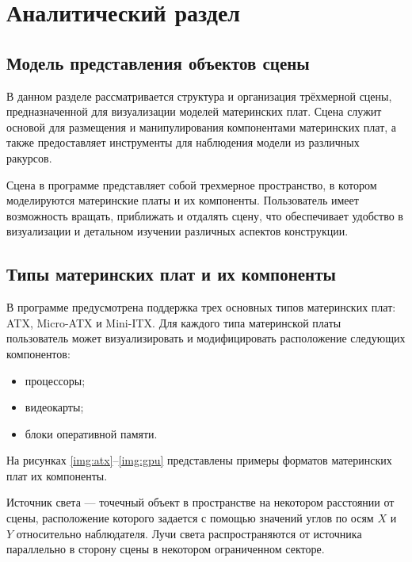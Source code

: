 \chapter{Аналитический раздел}

\section{Модель представления объектов сцены}

В данном разделе рассматривается структура и организация трёхмерной сцены, предназначенной для визуализации моделей материнских плат. Сцена служит основой для размещения и манипулирования компонентами материнских плат, а также предоставляет инструменты для наблюдения модели из различных ракурсов.

Сцена в программе представляет собой трехмерное пространство, в котором моделируются материнские платы и их компоненты. Пользователь имеет возможность вращать, приближать и отдалять сцену, что обеспечивает удобство в визуализации и детальном изучении различных аспектов конструкции.

\section{Типы материнских плат и их компоненты}

В программе предусмотрена поддержка трех основных типов материнских плат: ATX, Micro-ATX и Mini-ITX. Для каждого типа материнской платы пользователь может визуализировать и модифицировать расположение следующих компонентов:
\begin{itemize}[label=---]
	\item процессоры;
	\item видеокарты;
	\item блоки оперативной памяти.
\end{itemize}

На рисунках \ref{img:atx}--\ref{img:gpu} представлены примеры форматов материнских плат их компоненты.

\clearpage

Источник света --- точечный объект в пространстве на некотором расстоянии от сцены, расположение которого задается с помощью значений углов по осям $X$ и $Y$ относительно наблюдателя. Лучи света распространяются от источника параллельно в сторону сцены в некотором ограниченном секторе.


